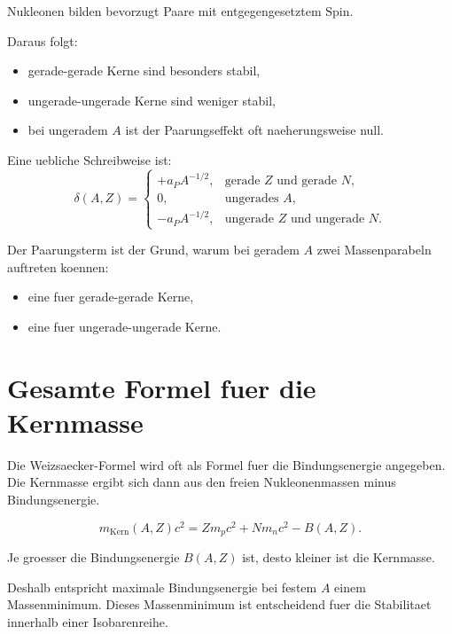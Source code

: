 \begin{conceptbox}
Nukleonen bilden bevorzugt Paare mit entgegengesetztem Spin.

Daraus folgt:
\begin{itemize}
    \item gerade-gerade Kerne sind besonders stabil,
    \item ungerade-ungerade Kerne sind weniger stabil,
    \item bei ungeradem $A$ ist der Paarungseffekt oft naeherungsweise null.
\end{itemize}
\end{conceptbox}

\begin{formulabox}
Eine uebliche Schreibweise ist:
\[
    \delta(A,Z)
    =
    \begin{cases}
        +a_P A^{-1/2}, & \text{gerade } Z \text{ und gerade } N,\\
        0, & \text{ungerades } A,\\
        -a_P A^{-1/2}, & \text{ungerade } Z \text{ und ungerade } N.
    \end{cases}
\]
\end{formulabox}

\begin{examtipbox}
Der Paarungsterm ist der Grund, warum bei geradem $A$ zwei Massenparabeln auftreten
koennen:
\begin{itemize}
    \item eine fuer gerade-gerade Kerne,
    \item eine fuer ungerade-ungerade Kerne.
\end{itemize}
\end{examtipbox}

\section{Gesamte Formel fuer die Kernmasse}

Die Weizsaecker-Formel wird oft als Formel fuer die Bindungsenergie angegeben.
Die Kernmasse ergibt sich dann aus den freien Nukleonenmassen minus Bindungsenergie.

\begin{formulabox}
\[
    m_{\mathrm{Kern}}(A,Z)c^2
    =
    Zm_pc^2
    +
    Nm_nc^2
    -
    B(A,Z).
\]
\end{formulabox}

\begin{conceptbox}
Je groesser die Bindungsenergie $B(A,Z)$ ist, desto kleiner ist die Kernmasse.

Deshalb entspricht maximale Bindungsenergie bei festem $A$ einem Massenminimum.
Dieses Massenminimum ist entscheidend fuer die Stabilitaet innerhalb einer
Isobarenreihe.
\end{conceptbox}

